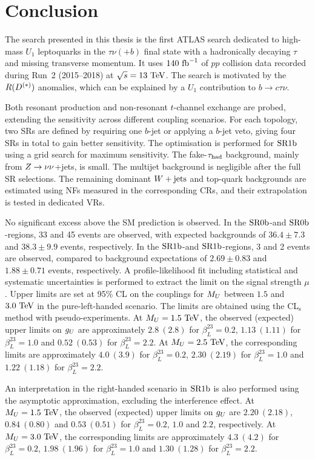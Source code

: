 \chapter{Conclusion}
\label{chapter:conclusion}

The search presented in this thesis is the first ATLAS search dedicated to high-mass $U_1$ leptoquarks in the $\tau\nu(+b)$ final state with a hadronically decaying $\tau$ and missing transverse momentum.
It uses $140~\mathrm{fb}^{-1}$ of $pp$ collision data recorded during Run~2 (2015--2018) at $\sqrt{s}=13~\mathrm{TeV}$.
The search is motivated by the $R(D^{(*)})$ anomalies, which can be explained by a $U_1$ contribution to $b\to c\tau\nu$.

Both resonant production and non-resonant $t$-channel exchange are probed, extending the sensitivity across different coupling scenarios.
For each topology, two SRs are defined by requiring one $b$-jet or applying a $b$-jet veto, giving four SRs in total to gain better sensitivity.
The optimisation is performed for $\mathrm{SR1b}$ using a grid search for maximum sensitivity.
The fake-$\tau_{\mathrm{had}}$ background, mainly from $Z\rightarrow\nu\nu$+jets, is small. The multijet background is negligible after the full SR selections.
The remaining dominant $W+\mathrm{jets}$ and top-quark backgrounds are estimated using NFs measured in the corresponding CRs, and their extrapolation is tested in dedicated VRs.

No significant excess above the SM prediction is observed.
In the $\mathrm{SR0b}$-\Res and $\mathrm{SR0b}$-\NonRes regions, 33 and 45 events are observed, with expected backgrounds of $36.4\pm7.3$ and $38.3\pm9.9$ events, respectively.
In the $\mathrm{SR1b}$-\Res and $\mathrm{SR1b}$-\NonRes regions, 3 and 2 events are observed, compared to background expectations of $2.69\pm0.83$ and $1.88\pm0.71$ events, respectively.
A profile-likelihood fit including statistical and systematic uncertainties is performed to extract the limit on the signal strength $\mu$.
Upper limits are set at 95\% CL on the couplings for $M_U$ between $1.5$ and $3.0~\mathrm{TeV}$ in the pure-left-handed scenario.
The limits are obtained using the CL$_{\mathrm{s}}$ method with pseudo-experiments.
At $M_U=1.5~\mathrm{TeV}$, the observed (expected) upper limits on $g_U$ are approximately $2.8\ (2.8)$ for $\beta_L^{23}=0.2$, $1.13\ (1.11)$ for $\beta_L^{23}=1.0$ and $0.52\ (0.53)$ for $\beta_L^{23}=2.2$.
At $M_U=2.5~\mathrm{TeV}$, the corresponding limits are approximately $4.0\ (3.9)$ for $\beta_L^{23}=0.2$, $2.30\ (2.19)$ for $\beta_L^{23}=1.0$ and $1.22\ (1.18)$ for $\beta_L^{23}=2.2$.

An interpretation in the right-handed scenario in $\mathrm{SR1b}$ is also performed using the asymptotic approximation, excluding the interference effect.
At $M_U=1.5~\mathrm{TeV}$, the observed (expected) upper limits on $g_U$ are $2.20\ (2.18)$, $0.84\ (0.80)$ and $0.53\ (0.51)$ for $\beta_L^{23}=0.2$, $1.0$ and $2.2$, respectively.
At $M_U=3.0~\mathrm{TeV}$, the corresponding limits are approximately $4.3\ (4.2)$ for $\beta_L^{23}=0.2$, $1.98\ (1.96)$ for $\beta_L^{23}=1.0$ and $1.30\ (1.28)$ for $\beta_L^{23}=2.2$.


